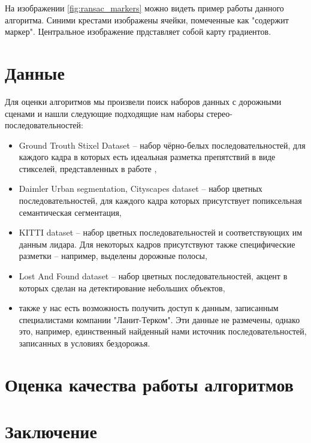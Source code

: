 \documentclass[aps,%
14pt,%
final,%
oneside,
onecolumn,%
musixtex, %
superscriptaddress,%
centertags]{extarticle} %
\begin{document}
На изображении \ref{fig:ransac_markers} можно видеть пример работы данного алгоритма. Синими крестами изображены ячейки, помеченные как "содержит маркер". Центральное изображение прдставляет собой карту градиентов.

\section{Данные}

Для оценки алгоритмов мы произвели поиск наборов данных с дорожными сценами и нашли следующие подходящие нам наборы стерео-последовательностей:

\begin{itemize}
    \item Ground Trouth Stixel Dataset -- набор чёрно-белых последовательностей, для каждого кадра в которых есть идеальная разметка препятствий в виде стикселей, представленных в работе \cite{pfeiffer2010efficient},
    \item Daimler Urban segmentation, Cityscapes dataset -- набор цветных последовательностей, для каждого кадра которых присутствует попиксельная семантическая сегментация,
    \item KITTI dataset -- набор цветных последовательностей и соответствующих им данным лидара. Для некоторых кадров присутствуют также специфические разметки -- например, выделены дорожные полосы,
    \item Lost And Found dataset -- набор цветных последовательностей, акцент в которых сделан на детектирование небольших объектов,
    \item также у нас есть возможность получить доступ к данным, записанным специалистами компании "Ланит-Терком". Эти данные не размечены, однако это, например, единственный найденный нами источник последовательностей, записанных в условиях бездорожья.
\end{itemize}

\section{Оценка качества работы алгоритмов}

\section{Заключение}



\newpage
\end{document}
